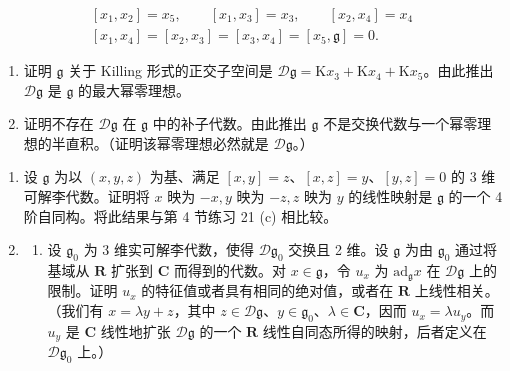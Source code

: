 \[
\begin{array}{r} \left[ x _ {1}, x _ {2} \right] = x _ {5}, \qquad \left[ x _ {1}, x _ {3} \right] = x _ {3}, \qquad \left[ x _ {2}, x _ {4} \right] = x _ {4} \\ \left[ x _ {1}, x _ {4} \right] = \left[ x _ {2}, x _ {3} \right] = \left[ x _ {3}, x _ {4} \right] = \left[ x _ {5}, \mathfrak {g} \right] = 0. \end{array}
\]

\begin{enumerate}
\def\labelenumi{(\alph{enumi})}
\setcounter{enumi}{1}
\item
  证明 \(\mathfrak{g}\) 关于 Killing 形式的正交子空间是 \(\mathcal{D}\mathfrak{g} = \mathrm{K}x_3 + \mathrm{K}x_4 + \mathrm{K}x_5\)。由此推出 \(\mathcal{D}\mathfrak{g}\) 是 \(\mathfrak{g}\) 的最大幂零理想。
\item
  证明不存在 \(\mathcal{D}\mathfrak{g}\) 在 \(\mathfrak{g}\) 中的补子代数。由此推出 \(\mathfrak{g}\) 不是交换代数与一个幂零理想的半直积。（证明该幂零理想必然就是 \(\mathcal{D}\mathfrak{g}\)。）
\end{enumerate}

\begin{enumerate}
\def\labelenumi{\arabic{enumi}.}
\setcounter{enumi}{6}
\item
  设 \(\mathfrak{g}\) 为以 \((x,y,z)\) 为基、满足 \([x,y] = z\)、\([x,z] = y\)、\([y,z] = 0\) 的 3 维可解李代数。证明将 \(x\) 映为 \(-x, y\) 映为 \(-z, z\) 映为 \(y\) 的线性映射是 \(\mathfrak{g}\) 的一个 4 阶自同构。将此结果与第 4 节练习 21 (c) 相比较。
\item
  \begin{enumerate}
  \def\labelenumii{(\alph{enumii})}
  \tightlist
  \item
    设 \(\mathfrak{g}_0\) 为 3 维实可解李代数，使得 \(\mathcal{D}\mathfrak{g}_0\) 交换且 2 维。设 \(\mathfrak{g}\) 为由 \(\mathfrak{g}_0\) 通过将基域从 \(\mathbf{R}\) 扩张到 \(\mathbf{C}\) 而得到的代数。对 \(x \in \mathfrak{g}\)，令 \(u_x\) 为 \(\mathrm{ad}_{\mathfrak{g}}x\) 在 \(\mathcal{D}\mathfrak{g}\) 上的限制。证明 \(u_x\) 的特征值或者具有相同的绝对值，或者在 \(\mathbf{R}\) 上线性相关。（我们有 \(x = \lambda y + z\)，其中 \(z \in \mathcal{D}\mathfrak{g}\)、\(y \in \mathfrak{g}_0\)、\(\lambda \in \mathbf{C}\)，因而 \(u_x = \lambda u_y\)。而 \(u_y\) 是 \(\mathbf{C}\) 线性地扩张 \(\mathcal{D}\mathfrak{g}\) 的一个 \(\mathbf{R}\) 线性自同态所得的映射，后者定义在 \(\mathcal{D}\mathfrak{g}_{0}\) 上。）
  \end{enumerate}
\end{enumerate}

